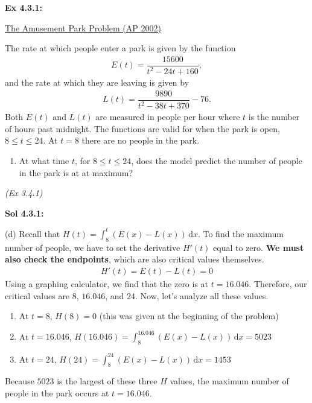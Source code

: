\begin{tcolorbox}[example]
    \textbf{Ex 4.3.1: } \begin{center}
        \underline{The Amusement Park Problem (AP 2002)}
    \end{center} \vspace{11pt}
    The rate at which people enter a park is given by the function \begin{align*}
        E(t) = \dfrac{15600}{t^2 - 24t + 160},
    \end{align*} and the rate at which they are leaving is given by \begin{align*}
        L(t) = \dfrac{9890}{t^2 - 38t + 370} - 76.
    \end{align*} Both $E(t)$ and $L(t)$ are measured in people per hour where $t$ is the number of hours past midnight. The functions are valid for when the park is open, $8 \leq t \leq 24$. At $t = 8$ there are no people in the park. \\
    \begin{enumerate}[label=\hspace{11pt}(\alph*), align=left, leftmargin=*, labelsep=0.25em, start=4]
        \item At what time $t$, for $8 \leq t \leq 24$, does the model predict the number of people in the park is at at maximum?
    \end{enumerate} \vspace{11pt}
    \footnotesize{\textit{(Ex 3.4.1)}}
\end{tcolorbox} 
\begin{tcolorbox}[solution]
    \textbf{Sol 4.3.1: } \par
    (d) Recall that $H(t) = \int_8^t (E(x) - L(x)) \,\mathrm{d}x$. To find the maximum number of people, we have to set the derivative $H'(t)$ equal to zero. \textbf{We must also check the endpoints}, which are also critical values themselves. \begin{align*}
        H'(t) = E(t) - L(t) = 0
    \end{align*}
    Using a graphing calculator, we find that the zero is at $t = 16.046$. Therefore, our critical values are $8$, $16.046$, and $24$. Now, let's analyze all these values. \par
    \vspace{11pt}
    \begin{enumerate}
        \item At $t = 8$, $H(8) = 0$ (this was given at the beginning of the problem) \\
        \item At $t = 16.046$, $H(16.046) = \int_8^{16.046} (E(x) - L(x)) \,\mathrm{d}x = 5023$ \\
        \item At $t = 24$, $H(24) = \int_8^{24} (E(x) - L(x)) \,\mathrm{d}x = 1453$
    \end{enumerate} \vspace{11pt}
    
    Because $5023$ is the largest of these three $H$ values, the maximum number of people in the park occurs at $\boxed{t = 16.046}$.
\end{tcolorbox} \vspace{11pt}

